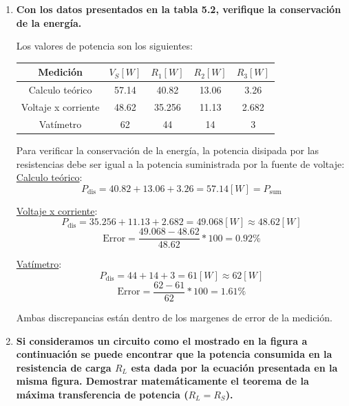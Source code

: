 \documentclass[letter,11pt]{article}
\begin{document}
\begin{enumerate}

\item \textbf{Con los datos presentados en la tabla 5.2, verifique la
conservación de la energía.}

Los valores de potencia son los siguientes:

\begin{center}
\begin{tabular}{|c|c|c|c|c|}
\hline
\textbf{Medición} & $V_S [W]$ & $R_1 [W]$ & $R_2 [W]$ & $R_3 [W]$
\tabularnewline \hline \hline
Calculo teórico & 57.14 & 40.82 & 13.06 & 3.26 \tabularnewline \hline
Voltaje x corriente & 48.62 & 35.256 & 11.13 & 2.682 \tabularnewline \hline
Vatímetro & 62 & 44 & 14 & 3 \tabularnewline \hline
\end{tabular}
\end{center}

Para verificar la conservación de la energía, la potencia disipada por las
resistencias debe ser igual a la potencia suministrada por la fuente de voltaje:
\\

\underline{Calculo teórico}:\\
\begin{equation*}
    P_{\text{dis}} = 40.82 + 13.06 + 3.26 = 57.14 [W] = P_{\text{sum}}
\end{equation*}

\underline{Voltaje x corriente}:\\
\begin{equation*}
    P_{\text{dis}} = 35.256 + 11.13 + 2.682 = 49.068 [W] \approx 48.62 [W]
\end{equation*}
\begin{equation*}
    \text{Error} = \frac{49.068 - 48.62}{48.62} * 100 = 0.92 \%
\end{equation*}

\underline{Vatímetro}:\\
\begin{equation*}
    P_{\text{dis}} = 44 + 14 + 3 = 61 [W] \approx 62 [W]
\end{equation*}
\begin{equation*}
    \text{Error} = \frac{62 - 61}{62} * 100 = 1.61 \%
\end{equation*}

Ambas discrepancias están dentro de los margenes de error de la medición.

\item \textbf{Si consideramos un circuito como el mostrado en la figura a
continuación se puede encontrar que la potencia consumida en la resistencia de
carga $R_L$ esta dada por la ecuación presentada en la misma figura. Demostrar
matemáticamente el teorema de la máxima transferencia de potencia
($R_L = R_S$).}\\


\end{enumerate}
\end{document}
